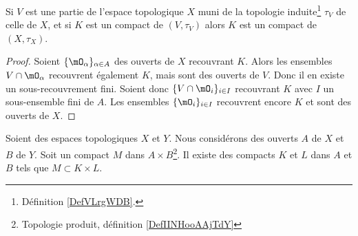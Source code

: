 \begin{proposition}     \label{PropGBZUooRKaOxy}
	Si \( V\) est une partie de l'espace topologique \( X\) muni de la topologie induite\footnote{Définition \ref{DefVLrgWDB}.} \( \tau_V\) de celle de \( X\), et si \( K\) est un compact de \( (V,\tau_V)\) alors \( K\) est un compact de \( (X,\tau_X)\).
\end{proposition}

\begin{proof}
	Soient \( \{ \mO_\alpha \}_{\alpha\in A}  \) des ouverts de \( X\) recouvrant \( K\). Alors les ensembles \( V\cap \mO_{\alpha}\) recouvrent également \( K\), mais sont des ouverts de \( V\). Donc il en existe un sous-recouvrement fini. Soient donc \( \{V\cap\mO_i\}_{i\in I}\) recouvrant \( K\) avec \( I\) un sous-ensemble fini de \( A\). Les ensembles \( \{\mO_i\}_{i\in I}\) recouvrent encore \( K\) et sont des ouverts de \( X\).
\end{proof}

\begin{proposition}
	Soient des espaces topologiques \( X\) et \( Y\). Nous considérons des ouverts \( A\) de \( X\) et \( B\) de \( Y\). Soit un compact \( M\) dans \( A\times B\)\footnote{Topologie produit, définition \ref{DefIINHooAAjTdY}}. Il existe des compacts \( K\) et \( L\) dans \( A\) et \( B\) tels que \( M\subset K\times L\).
\end{proposition}

